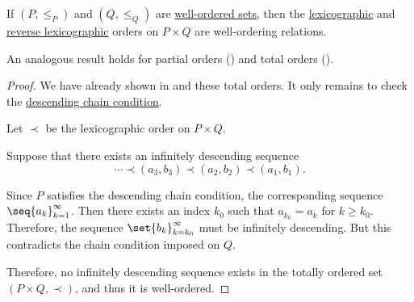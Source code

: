 \begin{proposition}\label{thm:well_ordered_lexicographic_order_is_well_ordered}
  If \( (P, \leq_P) \) and \( (Q, \leq_Q) \) are \hyperref[def:well_ordered_set]{well-ordered sets}, then the \hyperref[eq:def:lexicographic_order]{lexicographic} and \hyperref[eq:def:lexicographic_order/reverse]{reverse lexicographic} orders on \( P \times Q \) are well-ordering relations.
\end{proposition}
\begin{comments}
  \item An analogous result holds for partial orders () and total orders ().
\end{comments}
\begin{proof}
  We have already shown in  and these total orders. It only remains to check the \hyperref[def:chain_condition]{descending chain condition}.

  Let \( \prec \) be the lexicographic order on \( P \times Q \).

  Suppose that there exists an infinitely descending sequence
  \begin{equation*}
    \cdots \prec (a_3, b_3) \prec (a_2, b_2) \prec (a_1, b_1).
  \end{equation*}

  Since \( P \) satisfies the descending chain condition, the corresponding sequence \( \seq{ a_k }_{k=1}^\infty \). Then there exists an index \( k_0 \) such that \( a_{k_0} = a_k \) for \( k \geq k_0 \). Therefore, the sequence \( \set{ b_k }_{k=k_0}^\infty \) must be infinitely descending. But this contradicts the chain condition imposed on \( Q \).

  Therefore, no infinitely descending sequence exists in the totally ordered set \( (P \times Q, \prec) \), and thus it is well-ordered.
\end{proof}

